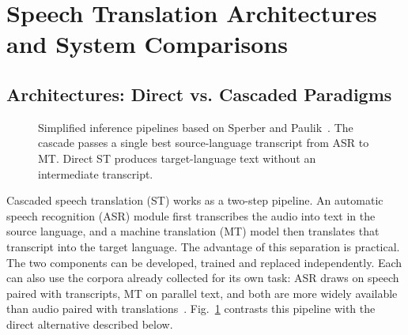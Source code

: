 \section{Speech Translation Architectures and System Comparisons}
\label{sec:architectures}

\subsection{Architectures: Direct vs. Cascaded Paradigms}

\begin{figure}[!ht]
\centering
{}
\caption{Simplified inference pipelines based on Sperber and
Paulik~\cite{sperber2020endtoend}. The cascade passes a single best
source-language transcript from ASR to MT. Direct ST produces target-language
text without an intermediate transcript.}
\label{fig:cascade-direct}
\end{figure}

Cascaded speech translation (ST) works as a two-step pipeline. An automatic
speech recognition (ASR) module first transcribes the audio into text in the
source language, and a machine translation (MT) model then translates that
transcript into the target language. The advantage of this separation is
practical. The two components can be developed, trained and replaced
independently. Each can also use the corpora already collected for its own
task: ASR draws on speech paired with transcripts, MT on parallel text, and
both are more widely available than audio paired with
translations~\cite{sperber2020endtoend}. Fig.~\ref{fig:cascade-direct}
contrasts this pipeline with the direct alternative described below.

